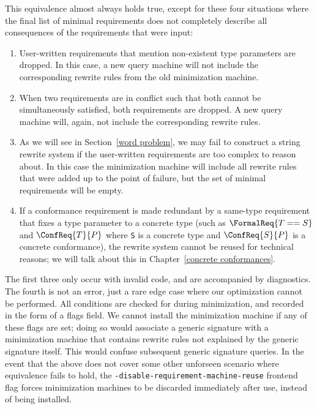\documentclass[../generics]{subfiles}
\begin{document}
This equivalence almost always holds true, except for these four situations where the final list of minimal requirements does not completely describe all consequences of the requirements that were input:
\begin{enumerate}
\item User-written requirements that mention non-existent type parameters are dropped. In this case, a new query machine will not include the corresponding rewrite rules from the old minimization machine.

\item When two requirements are in conflict such that both cannot be simultaneously satisfied, both requirements are dropped. A new query machine will, again, not include the corresponding rewrite rules.

\item As we will see in Section~\ref{word problem}, we may fail to construct a string rewrite system if the user-written requirements are too complex to reason about. In this case the minimization machine will include all rewrite rules that were added up to the point of failure, but the set of minimal requirements will be empty.

\item If a conformance requirement is made redundant by a same-type requirement that fixes a type parameter to a concrete type (such as $\FormalReq{T == S}$ and $\ConfReq{T}{P}$ where \texttt{S} is a concrete type and $\ConfReq{S}{P}$ is a concrete conformance), the rewrite system cannot be reused for technical reasons; we will talk about this in Chapter~\ref{concrete conformances}.
\end{enumerate}

The first three only occur with invalid code, and are accompanied by diagnostics. The fourth is not an error, just a rare edge case where our optimization cannot be performed. All conditions are checked for during minimization, and recorded in the form of a flags field. We cannot install the minimization machine if any of these flags are set; doing so would associate a generic signature with a minimization machine that contains rewrite rules not explained by the generic signature itself. This would confuse subsequent generic signature queries. In the event that the above does not cover some other unforseen scenario where equivalence fails to hold, the \texttt{-disable-requirement-machine-reuse} frontend flag forces minimization machines to be discarded immediately after use, instead of being installed.
\end{document}
